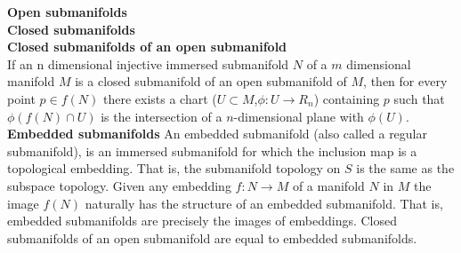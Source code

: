 \documentclass{article}
\begin{document}
\textbf{Open submanifolds}\\
\textbf{Closed submanifolds}\\
\textbf{Closed submanifolds of an open submanifold}\\
If an n dimensional injective immersed submanifold $N$ of a $m$ dimensional manifold $M$ is a closed submanifold of an open submanifold of $M$, then for every point $p \in f(N)$ there exists a chart ($U \subset M$,$\phi:U \to R_n $) containing $p$ such that $\phi(f(N) \cap U)$ is the intersection of a $n$-dimensional plane with $\phi(U)$.\\
\textbf{Embedded submanifolds} An embedded submanifold (also called a regular submanifold), is an immersed submanifold for which the inclusion map is a topological embedding. That is, the submanifold topology on $S$ is the same as the subspace topology. Given any embedding $f:N \to M$ of a manifold $N$ in $M$ the image $f(N)$ naturally has the structure of an embedded submanifold. That is, embedded submanifolds are precisely the images of embeddings. Closed submanifolds of an open submanifold are equal to embedded submanifolds.\\
\end{document}
